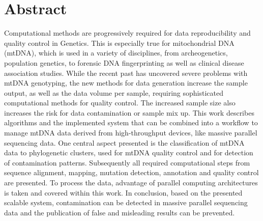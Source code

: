 \maketitle
\cleardoublepage






\hspace*{7cm}
\thispagestyle{empty}
\section*{Abstract}
{}

Computational methods are progressively required for data reproducibility and quality control in Genetics. This is especially true for mitochondrial DNA (mtDNA), which is used in a variety of disciplines, from archeogenetics, population genetics, to forensic DNA fingerprinting as well as clinical disease association studies. While the recent past has uncovered severe problems with mtDNA genotyping, the new methods for data generation increase the sample output, as well as the data volume per sample, requiring sophisticated computational methods for quality control. The increased sample size also increases the risk for data contamination or sample mix up. This work describes algorithms and the implemented system that can be combined into a workflow to manage mtDNA data derived from high-throughput devices, like massive parallel sequencing data. One central aspect presented is the classification of mtDNA data to phylogenetic clusters, used for mtDNA quality control and for detection of contamination patterns. Subsequently all required computational steps from sequence alignment, mapping, mutation detection, annotation and quality control are presented. To process the data, advantage of parallel computing architectures is taken and covered within this work. In conclusion, based on the presented scalable system, contamination can be detected in massive parallel sequencing data and the publication of false and misleading results can be prevented.



